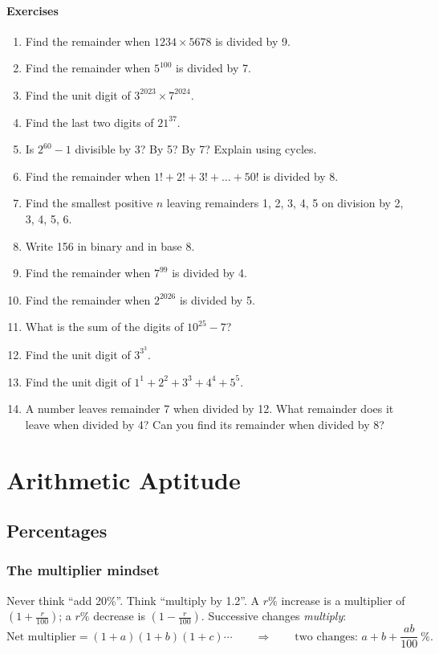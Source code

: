 \documentclass[11pt,a4paper,openany]{report}
\newenvironment{exercises}{\subsection*{Exercises \thechapter}\begin{enumerate}[label=\textbf{\thechapter.\arabic*},leftmargin=3.2em]}{\end{enumerate}}
\begin{document}
\begin{exercises}
\item Find the remainder when $1234\times5678$ is divided by 9.
\item Find the remainder when $5^{100}$ is divided by 7.
\item Find the unit digit of $3^{2023}\times7^{2024}$.
\item Find the last two digits of $21^{37}$.
\item Is $2^{60}-1$ divisible by 3? By 5? By 7? Explain using cycles.
\item Find the remainder when $1!+2!+3!+\dots+50!$ is divided by 8.
\item Find the smallest positive $n$ leaving remainders 1, 2, 3, 4, 5 on division by 2, 3, 4, 5, 6.
\item Write 156 in binary and in base 8.
\item Find the remainder when $7^{99}$ is divided by 4.
\item Find the remainder when $2^{2026}$ is divided by 5.
\item What is the sum of the digits of $10^{25}-7$?
\item Find the unit digit of $3^{3^3}$.
\item Find the unit digit of $1^1+2^2+3^3+4^4+5^5$.
\item A number leaves remainder 7 when divided by 12. What remainder does it leave when divided by 4? Can you find its remainder when divided by 8?
\end{exercises}

\part{Arithmetic Aptitude}
\chapter{Percentages}\label{ch:pct}

\section{The multiplier mindset}
Never think ``add 20\%''. Think ``multiply by 1.2''. A $r\%$ increase is a multiplier of $(1+\frac r{100})$; a
$r\%$ decrease is $(1-\frac r{100})$. Successive changes \emph{multiply}:
\[\text{Net multiplier}=(1+a)(1+b)(1+c)\cdots\qquad\Rightarrow\qquad\text{two changes: } a+b+\frac{ab}{100}\ \%.\]
\end{document}
